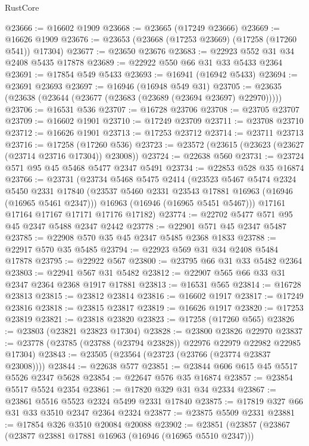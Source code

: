 \begin{lexlean}{RustCore}
\begin{coremodule}
@23666 := @16602 @1909
@23668 := @23665 (@17249 @23666)
@23669 := @16626 @1909
@23676 := @23653 (@23668 (@17253 @23669) (@17258 (@17260 @541)) @17304)
@23677 := @23650 @23676
@23683 := @22923 @552 @31 @34 @2408 @5435 @17878
@23689 := @22922 @550 @66 @31 @33 @5433 @2364
@23691 := @17854 @549 @5433
@23693 := @16941 (@16942 @5433)
@23694 := @23691 @23693
@23697 := @16946 (@16948 @549 @31)
@23705 := @23635 (@23638 (@23644 (@23677 (@23683 (@23689 (@23694 @23697) @22970)))))
@23706 := @16531 @536
@23707 := @16728 @23706
@23708 := @23705 @23707
@23709 := @16602 @1901
@23710 := @17249 @23709
@23711 := @23708 @23710
@23712 := @16626 @1901
@23713 := @17253 @23712
@23714 := @23711 @23713
@23716 := @17258 (@17260 @536)
@23723 := @23572 (@23615 (@23623 (@23627 (@23714 @23716 @17304)) @23008))
@23724 := @22638 @560
@23731 := @23724 @571 @95 @45 @5468 @5477 @2347 @5491
@23734 := @22853 @528 @35 @16874
@23766 := @23731
    (@23734
      @5468
      @5475
      @2414
      (@23523
        @5467
        @5474
        @2324
        @5450
        @2331
        @17840
        (@23537 @5460 @2331 @23543 @17881 @16963 (@16946 (@16965 @5461 @2347)))
        @16963
        (@16946 (@16965 @5451 @5467)))
      @17161
      @17164
      @17167
      @17171
      @17176
      @17182)
@23774 := @22702 @5477 @571 @95 @45 @2347 @5488 @2347 @2442
@23778 := @22901 @571 @45 @2347 @5487
@23785 := @22908 @570 @35 @45 @2347 @5485 @2368 @1833
@23788 := @22917 @570 @35 @5485
@23794 := @22923 @569 @31 @34 @2408 @5484 @17878
@23795 := @22922 @567
@23800 := @23795 @66 @31 @33 @5482 @2364
@23803 := @22941 @567 @31 @5482
@23812 := @22907 @565 @66 @33 @31 @2347 @2364 @2368 @1917 @17881
@23813 := @16531 @565
@23814 := @16728 @23813
@23815 := @23812 @23814
@23816 := @16602 @1917
@23817 := @17249 @23816
@23818 := @23815 @23817
@23819 := @16626 @1917
@23820 := @17253 @23819
@23821 := @23818 @23820
@23823 := @17258 (@17260 @565)
@23826 := @23803 (@23821 @23823 @17304)
@23828 := @23800 @23826 @22970
@23837 := @23778 (@23785 (@23788 (@23794 @23828)) @22976 @22979 @22982 @22985 @17304)
@23843 := @23505 (@23564 (@23723 (@23766 (@23774 @23837 @23008))))
@23844 := @22638 @577
@23851 := @23844 @606 @615 @45 @5517 @5526 @2347 @5628
@23854 := @22647 @576 @35 @16874
@23857 := @23854 @5517 @5524 @2354
@23861 := @17820 @329 @31 @34 @2334
@23867 := @23861 @5516 @5523 @2324 @5499 @2331 @17840
@23875 := @17819 @327 @66 @31 @33 @3510 @2347 @2364 @2324
@23877 := @23875 @5509 @2331
@23881 := @17854 @326 @3510 @20084 @20088
@23902 := @23851
    (@23857
      (@23867
        (@23877 @23881 @17881 @16963 (@16946 (@16965 @5510 @2347)))

\end{coremodule}
\end{lexlean}
